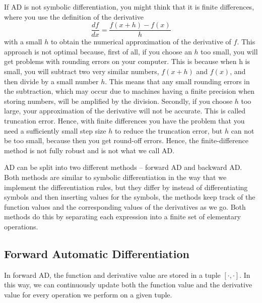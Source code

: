 If AD is not symbolic differentiation, you might think that it is finite differences, where you use the definition of the derivative
\begin{equation*}
    \frac{df}{dx} = \frac{f(x+h) - f(x)}{h}
\end{equation*}
with a small $h$ to obtain the numerical approximation of the derivative of $f$. This approach is not optimal because, first of all, if you choose an $h$ too small, you will get problems with rounding errors on your computer. This is because when h is small, you will subtract two very similar numbers, $f(x+h)$ and $f(x)$, and then divide by a small number $h$. This means that any small rounding errors in the subtraction, which may occur due to machines having a finite precision when storing numbers, will be amplified by the division. Secondly, if you choose $h$ too large, your approximation of the derivative will not be accurate. This is called truncation error. Hence, with finite differences you have the problem that you need a sufficiently small step size $h$ to reduce the truncation error, but $h$ can not be too small, because then you get round-off errors. Hence, the finite-difference method is not fully robust and is not what we call AD.

AD can be split into two different methods -- forward AD and backward AD. Both methods are similar to symbolic differentiation in the way that we implement the differentiation rules, but they differ by instead of differentiating symbols and then inserting values for the symbols, the methods keep track of the function values and the corresponding values of the derivatives as we go. Both methods do this by separating each expression into a finite set of elementary operations. 

\subsection{Forward Automatic Differentiation}
In forward AD, the function and derivative value are stored in a tuple $[\cdot, \cdot]$. In this way, we can continuously update both the function value and the derivative value for every operation we perform on a given tuple. 

